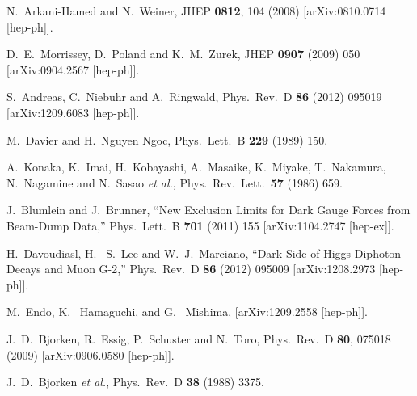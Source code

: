   N.~Arkani-Hamed and N.~Weiner,
  JHEP {\bf 0812}, 104 (2008)
  [arXiv:0810.0714 [hep-ph]].

D.~E.~Morrissey, D.~Poland and K.~M.~Zurek,
JHEP {\bf 0907} (2009) 050
[arXiv:0904.2567 [hep-ph]].

S.~Andreas, C.~Niebuhr and A.~Ringwald,
Phys.\ Rev.\ D {\bf 86} (2012) 095019
[arXiv:1209.6083 [hep-ph]].

M.~Davier and H.~Nguyen Ngoc,
Phys.\ Lett.\ B {\bf 229} (1989) 150.

A.~Konaka, K.~Imai, H.~Kobayashi, A.~Masaike, K.~Miyake, T.~Nakamura, N.~Nagamine and N.~Sasao {\it et al.},
Phys.\ Rev.\ Lett.\ {\bf 57} (1986) 659.

J.~Blumlein and J.~Brunner,
``New Exclusion Limits for Dark Gauge Forces from Beam-Dump Data,''
Phys.\ Lett.\ B {\bf 701} (2011) 155
[arXiv:1104.2747 [hep-ex]].

H.~Davoudiasl, H.~-S.~Lee and W.~J.~Marciano,
``Dark Side of Higgs Diphoton Decays and Muon G-2,''
Phys.\ Rev.\ D {\bf 86} (2012) 095009
[arXiv:1208.2973 [hep-ph]].


M.~Endo, K.~ Hamaguchi, and G.~ Mishima, [arXiv:1209.2558 [hep-ph]]. 

  J.~D.~Bjorken, R.~Essig, P.~Schuster and N.~Toro,
  Phys.\ Rev.\ D {\bf 80}, 075018 (2009)
  [arXiv:0906.0580 [hep-ph]].

J.~D.~Bjorken {\it et al.},
Phys.\ Rev.\ D {\bf 38} (1988) 3375.


